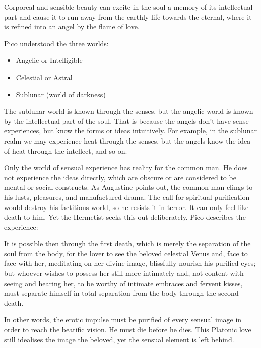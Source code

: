\begin{quotex}
Corporeal and sensible beauty can excite in the soul a memory of its intellectual part and cause it to run away from the earthly life towards the eternal, where it is refined into an angel by the flame of love. 

\end{quotex}
Pico understood the three worlds:

\begin{itemize}
\item Angelic or Intelligible 
\item Celestial or Astral 
\item Sublunar (world of darkness) 
\end{itemize}
The sublunar world is known through the senses, but the angelic world is known by the intellectual part of the soul. That is because the angels don't have sense experiences, but know the forms or ideas intuitively. For example, in the sublunar realm we may experience heat through the senses, but the angels know the idea of heat through the intellect, and so on.

Only the world of sensual experience has reality for the common man. He does not experience the ideas directly, which are obscure or are considered to be mental or social constructs. As Augustine points out, the common man clings to his lusts, pleasures, and manufactured drama. The call for spiritual purification would destroy his factitious world, so he resists it in terror. It can only feel like death to him. Yet the Hermetist seeks this out deliberately. Pico describes the experience:

\begin{quotex}
It is possible then through the first death, which is merely the separation of the soul from the body, for the lover to see the beloved celestial Venus and, face to face with her, meditating on her divine image, blissfully nourish his purified eyes; but whoever wishes to possess her still more intimately and, not content with seeing and hearing her, to be worthy of intimate embraces and fervent kisses, must separate himself in total separation from the body through the second death. 

\end{quotex}
In other words, the erotic impulse must be purified of every sensual image in order to reach the beatific vision. He must die before he dies. This Platonic love still idealises the image the beloved, yet the sensual element is left behind.

